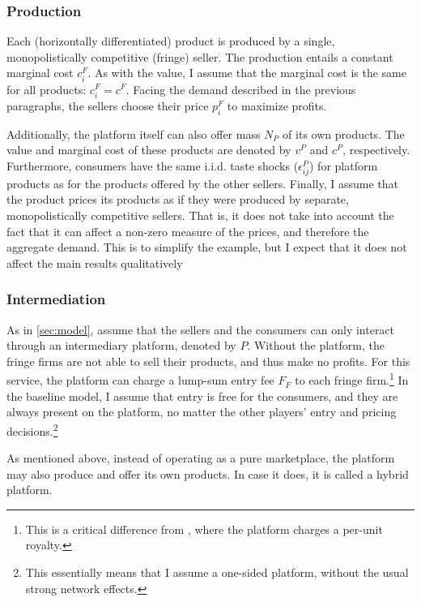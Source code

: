\documentclass[a4paper]{article}
\begin{document}
\subsubsection{Production}

Each (horizontally differentiated) product is produced by a single, monopolistically competitive (fringe) seller.
The production entails a constant marginal cost $c^F_i$.
As with the value, I assume that the marginal cost is the same for all products: $c^F_i = c^F$.
Facing the demand described in the previous paragraphs, the sellers choose their price $p^F_i$ to maximize profits.

Additionally, the platform itself can also offer mass $N_P$ of its own products.
The value and marginal cost of these products are denoted by $v^P$ and $c^P$, respectively.
Furthermore, consumers have the same i.i.d. taste shocks ($\epsilon^P_{ij}$) for platform products as for the products offered by the other sellers.
Finally, I assume that the product prices its products as if they were produced by separate, monopolistically competitive sellers.
That is, it does not take into account the fact that it can affect a non-zero measure of the prices, and therefore the aggregate demand.
This is to simplify the example, but I expect that it does not affect the main results qualitatively

\subsubsection{Intermediation}

As in \cref{sec:model}, assume that the sellers and the consumers can only interact through an intermediary platform, denoted by $P$.
Without the platform, the fringe firms are not able to sell their products, and thus make no profits.
For this service, the platform can charge a lump-sum entry fee $F_F$ to each fringe firm.\footnote{
    This is a critical difference from \textcite[]{anderson2021hybrid}, where the platform charges a per-unit royalty.
}
In the baseline model, I assume that entry is free for the consumers, and they are always present on the platform, no matter the other players' entry and pricing decisions.\footnote{
    This essentially means that I assume a one-sided platform, without the usual strong network effects.
}

As mentioned above, instead of operating as a pure marketplace, the platform may also produce and offer its own products.
In case it does, it is called a hybrid platform.
\end{document}
